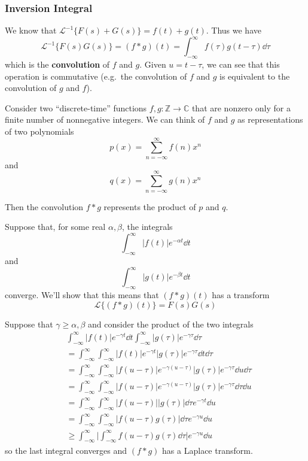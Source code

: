 \documentclass[12pt]{article}
\newcommand{\laplace}[1]{\ensuremath{\mathcal{L} \{#1\}}}
\begin{document}
\subsubsection{Inversion Integral}
We know that $\mathcal{L}^{-1} \{ F(s) + G(s) \} = f(t) + g(t)$. Thus we have \[ \mathcal{L}^{-1} \{ F(s)G(s) \} = (f * g)(t) = \int_{-\infty}^\infty f(\tau)g(t-\tau) \dd\tau \] which is the {\bf convolution} of $f$ and $g$. Given $u = t - \tau$, we can see that this operation is commutative (e.g.\ the convolution of $f$ and $g$ is equivalent to the convolution of $g$ and $f$).

Consider two ``discrete-time'' functions $f,g : \mathbb{Z} \to \mathbb{C}$ that are nonzero only for a finite number of nonnegative integers. We can think of $f$ and $g$ as representations of two polynomials \[ p(x) = \sum_{n=-\infty}^\infty f(n)x^n \] and \[ q(x) = \sum_{n=-\infty}^\infty g(n) x^n \]

Then the convolution $f * g$ represents the product of $p$ and $q$.

Suppose that, for some real $\alpha, \beta$, the integrals \[ \int_{-\infty}^\infty |f(t)| e^{-\alpha t} \dd t \] and \[ \int_{-\infty}^\infty |g(t)| e^{-\beta t} \dd t \] converge. We'll show that this means that $(f * g)(t)$ has a transform \[ \laplace{(f*g)(t)} = F(s)G(s) \]

Suppose that $\gamma \geq \alpha, \beta$ and consider the product of the two integrals
\begin{align*}
&\int_{-\infty}^\infty |f(t)| e^{-\gamma t} \dd t \int_{-\infty}^\infty |g(\tau)| e^{-\gamma \tau} \dd \tau\\
&= \int_{-\infty}^\infty \int_{-\infty}^\infty |f(t)|e^{-\gamma t} |g(\tau)|e^{-\gamma \tau} \dd t \dd \tau\\
&= \int_{-\infty}^\infty\int_{-\infty}^\infty |f(u-\tau)|e^{-\gamma(u-\tau)} |g(\tau)|e^{-\gamma \tau} \dd u \dd \tau\\
&= \int_{-\infty}^\infty \int_{-\infty}^\infty |f(u-\tau)|e^{-\gamma(u-\tau)} |g(\tau)| e^{-\gamma \tau} \dd \tau \dd u\\
&= \int_{-\infty}^\infty \int_{-\infty}^\infty |f(u-\tau)| |g(\tau)| \dd \tau e^{-\gamma t} \dd u \\
&= \int_{-\infty}^\infty \int_{-\infty}^\infty |f(u-\tau) g(\tau)| \dd \tau e^{-\gamma u} \dd u\\
&\geq \int_{-\infty}^\infty \bigg| \int_{-\infty}^\infty f(u-\tau)g(\tau) \dd \tau \bigg| e^{-\gamma u} \dd u
\end{align*}
so the last integral converges and $(f * g)$ has a Laplace transform.
\end{document}
